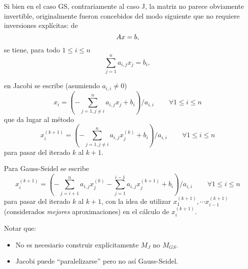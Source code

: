 Si bien en el caso GS, contrariamente al  caso J, la matriz no parece obviamente invertible, originalmente fueron concebidos del  modo siguiente que no requiere inversiones explícitas:
de
$$
\Ab\xb=\bb,
$$
se tiene, para todo $1\le i\le n$
$$
\sum_{j=1}^na_{i,j}x_j=b_i,
$$

en Jacobi se escribe (asumiendo $a_{i,i}\neq0$)
$$
x_i=\left(-\sum_{j=1,j\neq i}^na_{i,j}x_j+b_i\right)/a_{i,i}\, \qquad \forall 1\le i\le n
$$
que da lugar al método
$$
x_i^{(k+1)}=\left(-\sum_{j=1,j\neq i}^na_{i,j}x_j^{(k)}+b_i\right)/a_{i,i}\, \qquad \forall 1\le i\le n
$$
para pasar del iterado $k$ al $k+1$.



Para Gauss-Seidel se escribe
$$
x_i^{(k+1)}=\left(-\sum_{j=i+1}^na_{i,j}x_j^{(k
)}-\sum_{j=1}^{i-1}a_{i,j}x_j^{(k+1)}+b_i\right)/a_{i,i}\, \qquad \forall 1\le i\le n
$$
para pasar del iterado $k$ al $k+1$, con la idea de  utilizar
$x_1^{(k+1)},\cdots x_{i-1}^{(k+1)}$ (considerados \emph{mejores} aproximaciones) en el cálculo de $x_i^{(k+1)}$.

Notar que:
\begin{itemize}
\item No es necesiario construir explícitamente $M_J$ no $M_{GS}$.
 \item Jacobi puede ``paralelizarse'' pero no así Gauss-Seidel.
\end{itemize}



